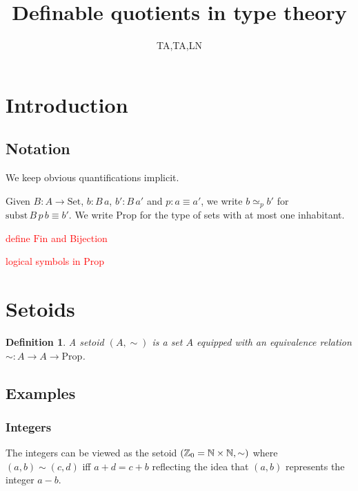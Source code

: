 \documentclass[preprint,12pt]{elsarticle}
\newtheorem{definition}{Definition}[section]
\newcommand{\prop}{\mathrm{Prop}}
\newcommand{\subst}{\mathrm{subst}}
\newcommand{\Set}{\mathrm{Set}}
\newcommand{\Fin}{\mathrm{Fin}}
\newcommand{\Z}{\mathbb{Z}}
\newcommand{\todo}[1]{\textcolor{red}{#1}}
\begin{document}


\begin{frontmatter}
\title{Definable quotients in type theory}
\author{TA,TA,LN}
\address{Division of Computer Science, University of Nottingham in Ningbo, China,199 Taikang Road East, 315100, Ningbo, China.}

\begin{abstract}

\end{abstract}

\begin{keyword}

\end{keyword}
\end{frontmatter}


\section{Introduction}\label{sec:introduction}
\subsection{Notation}
We keep obvious quantifications implicit.

Given $B : A \to \Set$, $b : B\,a$, $b' : B\,a'$ and $p : a\equiv a'$, we write $b \simeq_{p} b'$ for $\subst\,B\,p\,b \equiv b'$.
We write $\prop$ for the type of sets with at most one inhabitant.

\todo{define $\Fin$ and Bijection}  

\todo{logical symbols in Prop}


\section{Setoids}\label{sec:setoids}
\begin{definition}
A setoid $(A,\sim)$ is a set $A$ equipped with an equivalence relation $\sim : A \to A \to \prop$.
\end{definition}
\subsection{Examples}\label{sec:setoids:examples}
\subsubsection*{Integers}
The integers can be viewed as the setoid $(\Z_0=\nat\times\nat,\sim)$ where $(a,b)\sim(c,d)$ if{f} $a+d=c+b$ reflecting the idea that $(a,b)$ represents the integer $a-b$.
\end{document}
